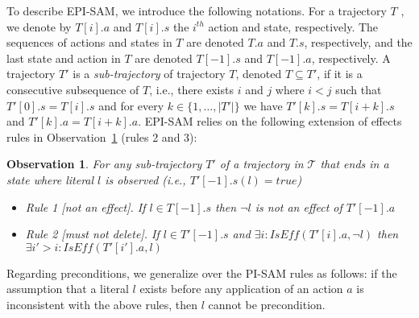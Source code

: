 \documentclass[letterpaper]{article} %
\newtheorem{observation}{Observation}
\newcommand{\true}{\textit{true}}
\newcommand{\false}{\textit{false}}
\newcommand{\iseff}{\textit{IsEff}}
\begin{document}
To describe EPI-SAM, we introduce the following notations. 
For a trajectory $T$ , we denote by $T[i].a$ and $T[i].s$ the $i^{th}$ action and state, respectively. 
The sequences of actions and states in $T$ are denoted $T.a$ and $T.s$, respectively, and the last state and action in $T$ are denoted $T[-1].s$ and $T[-1].a$, respectively.  
A trajectory $T'$ is a \emph{sub-trajectory} of trajectory $T$, denoted $T\subseteq T'$, if it is a consecutive subsequence of $T$, i.e., there exists $i$ and $j$ where $i<j$ such that  $T'[0].s=T[i].s$ 
and for every $k\in \{1,\ldots,|T'|\}$ we have $T'[k].s=T[i+k].s$ and $T'[k].a=T[i+k].a$. 
EPI-SAM relies on the following extension of effects rules in Observation~\ref{obs:pi-sam-learning-rules} (rules 2 and 3):
\begin{observation}\label{obs:pi-sam-learning-rules}
For any sub-trajectory $T'$ of a trajectory in $\mathcal{T}$ that ends in a state where literal $l$ is observed (i.e., $T'[-1].s(l)= \true$) 
    \begin{itemize}
        \item Rule 1 [not an effect]. If $l\in T[-1].s$ then $\neg l$ is not an effect of $T'[-1].a$
        \item Rule 2 [must not delete]. If $l\in T'[-1].s$ and $\exists i: \iseff(T'[i].a,\neg l)$ then $\exists i'>i: \iseff(T'[i'].a,l)$ 
    \end{itemize}


\end{observation}

Regarding preconditions, we generalize over the PI-SAM rules as follows: if the assumption that a literal $l$ exists before any application of an action $a$ is inconsistent with the above rules, then $l$ cannot be precondition. 
\end{document}
